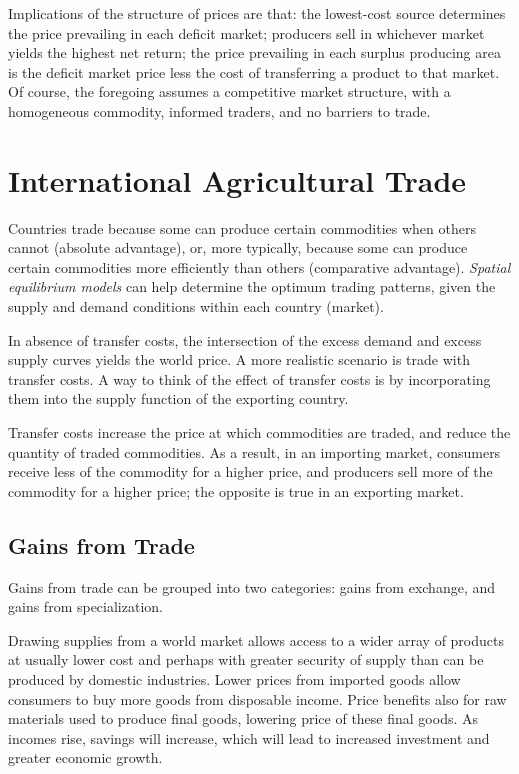 \documentclass[]{book}
\begin{document}
Implications of the structure of prices are that: the lowest-cost source
determines the price prevailing in each deficit market; producers sell
in whichever market yields the highest net return; the price prevailing
in each surplus producing area is the deficit market price less the cost
of transferring a product to that market. Of course, the foregoing
assumes a competitive market structure, with a homogeneous commodity,
informed traders, and no barriers to trade.

\chapter{International Agricultural
Trade}\label{international-agricultural-trade}

Countries trade because some can produce certain commodities when others
cannot (absolute advantage), or, more typically, because some can
produce certain commodities more efficiently than others (comparative
advantage). \emph{Spatial equilibrium models} can help determine the
optimum trading patterns, given the supply and demand conditions within
each country (market).

In absence of transfer costs, the intersection of the excess demand and
excess supply curves yields the world price. A more realistic scenario
is trade with transfer costs. A way to think of the effect of transfer
costs is by incorporating them into the supply function of the exporting
country.

Transfer costs increase the price at which commodities are traded, and
reduce the quantity of traded commodities. As a result, in an importing
market, consumers receive less of the commodity for a higher price, and
producers sell more of the commodity for a higher price; the opposite is
true in an exporting market.

\section{Gains from Trade}\label{gains-from-trade}

Gains from trade can be grouped into two categories: gains from
exchange, and gains from specialization.

Drawing supplies from a world market allows access to a wider array of
products at usually lower cost and perhaps with greater security of
supply than can be produced by domestic industries. Lower prices from
imported goods allow consumers to buy more goods from disposable income.
Price benefits also for raw materials used to produce final goods,
lowering price of these final goods. As incomes rise, savings will
increase, which will lead to increased investment and greater economic
growth.
\end{document}
